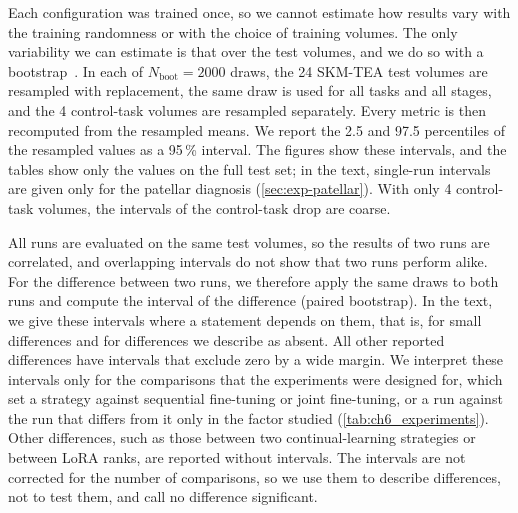 Each configuration was trained once, so we cannot estimate how results vary with the training randomness or with the choice of training volumes.
The only variability we can estimate is that over the test volumes, and we do so with a bootstrap~\cite{efron1993bootstrap}.
In each of $N_{\mathrm{boot}} = 2000$ draws, the 24 SKM-TEA test volumes are resampled with replacement, the same draw is used for all tasks and all stages, and the 4 control-task volumes are resampled separately.
Every metric is then recomputed from the resampled means.
We report the 2.5 and 97.5 percentiles of the resampled values as a 95\,\% interval.
The figures show these intervals, and the tables show only the values on the full test set; in the text, single-run intervals are given only for the patellar diagnosis (\cref{sec:exp-patellar}).
With only 4 control-task volumes, the intervals of the control-task drop are coarse.

All runs are evaluated on the same test volumes, so the results of two runs are correlated, and overlapping intervals do not show that two runs perform alike.
For the difference between two runs, we therefore apply the same draws to both runs and compute the interval of the difference (paired bootstrap).
In the text, we give these intervals where a statement depends on them, that is, for small differences and for differences we describe as absent.
All other reported differences have intervals that exclude zero by a wide margin.
We interpret these intervals only for the comparisons that the experiments were designed for, which set a strategy against sequential fine-tuning or joint fine-tuning, or a run against the run that differs from it only in the factor studied (\cref{tab:ch6_experiments}).
Other differences, such as those between two continual-learning strategies or between LoRA ranks, are reported without intervals.
The intervals are not corrected for the number of comparisons, so we use them to describe differences, not to test them, and call no difference significant.

